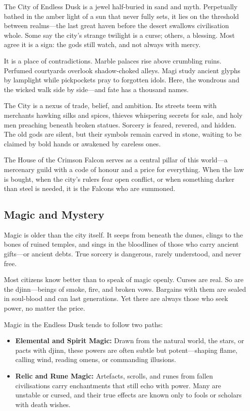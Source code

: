 The City of Endless Dusk is a jewel half-buried in sand and myth. Perpetually bathed in the amber light of a sun that never fully sets, it lies on the threshold between realms—the last great haven before the desert swallows civilisation whole. Some say the city's strange twilight is a curse; others, a blessing. Most agree it is a sign: the gods still watch, and not always with mercy.

It is a place of contradictions. Marble palaces rise above crumbling ruins. Perfumed courtyards overlook shadow-choked alleys. Magi study ancient glyphs by lamplight while pickpockets pray to forgotten idols. Here, the wondrous and the wicked walk side by side—and fate has a thousand names.

The City is a nexus of trade, belief, and ambition. Its streets teem with merchants hawking silks and spices, thieves whispering secrets for sale, and holy men preaching beneath broken statues. Sorcery is feared, revered, and hidden. The old gods are silent, but their symbols remain carved in stone, waiting to be claimed by bold hands or awakened by careless ones.

The House of the Crimson Falcon serves as a central pillar of this world—a mercenary guild with a code of honour and a price for everything. When the law is bought, when the city’s rulers fear open conflict, or when something darker than steel is needed, it is the Falcons who are summoned.


\subsection{Magic and Mystery}

Magic is older than the city itself. It seeps from beneath the dunes, clings to the bones of ruined temples, and sings in the bloodlines of those who carry ancient gifts—or ancient debts. True sorcery is dangerous, rarely understood, and never free.

Most citizens know better than to speak of magic openly. Curses are real. So are the djinn—beings of smoke, fire, and broken vows. Bargains with them are sealed in soul-blood and can last generations. Yet there are always those who seek power, no matter the price.

Magic in the Endless Dusk tends to follow two paths:

\begin{itemize}
    \item \textbf{Elemental and Spirit Magic:} Drawn from the natural world, the stars, or pacts with djinn, these powers are often subtle but potent—shaping flame, calling wind, reading omens, or commanding illusions.
    \item \textbf{Relic and Rune Magic:} Artefacts, scrolls, and runes from fallen civilisations carry enchantments that still echo with power. Many are unstable or cursed, and their true effects are known only to fools or scholars with death wishes.
\end{itemize}

